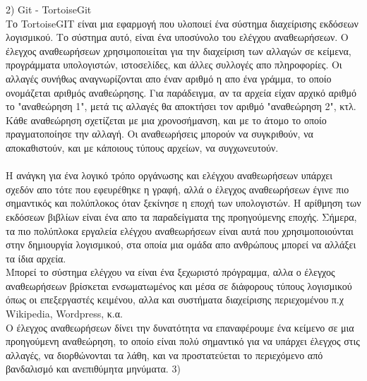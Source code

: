 2) Git - TortoiseGit\\
Το TortoiseGIT είναι μια εφαρμογή που υλοποιεί ένα σύστημα διαχείρισης εκδόσεων λογισμικού. Το σύστημα αυτό, είναι ένα υποσύνολο του ελέγχου αναθεωρήσεων. Ο έλεγχος αναθεωρήσεων χρησιμοποιείται για την διαχείριση των αλλαγών σε κείμενα, προγράμματα υπολογιστών, ιστοσελίδες, και άλλες συλλογές απο πληροφορίες. Οι αλλαγές συνήθως αναγνωρίζονται απο έναν αριθμό η απο ένα γράμμα, το οποίο ονομάζεται αριθμός αναθεώρησης. Για παράδειγμα, αν τα αρχεία είχαν αρχικό αριθμό το "αναθεώρηση 1", μετά τις αλλαγές θα αποκτήσει τον αριθμό "αναθεώρηση 2", κτλ. Κάθε αναθεώρηση σχετίζεται με μια χρονοσήμανση, και με το άτομο το οποίο πραγματοποίησε την αλλαγή. Οι αναθεωρήσεις μπορούν να συγκριθούν, να αποκαθιστούν, και με κάποιους τύπους αρχείων, να συγχωνευτούν.\\
\\
Η ανάγκη για ένα λογικό τρόπο οργάνωσης και ελέγχου αναθεωρήσεων υπάρχει σχεδόν απο τότε που εφευρέθηκε η γραφή, αλλά ο έλεγχος αναθεωρήσεων έγινε πιο σημαντικός και πολύπλοκος όταν ξεκίνησε η εποχή των υπολογιστών. Η αρίθμηση των εκδόσεων βιβλίων είναι ένα απο τα παραδείγματα της προηγούμενης εποχής. Σήμερα, τα πιο πολύπλοκα εργαλεία ελέγχου αναθεωρήσεων είναι αυτά που χρησιμοποιούνται στην δημιουργία λογισμικού, στα οποία μια ομάδα απο ανθρώπους μπορεί να αλλάξει τα ίδια αρχεία.\\
Μπορεί το σύστημα ελέγχου να είναι ένα ξεχωριστό πρόγραμμα, αλλα ο έλεγχος αναθεωρήσεων βρίσκεται ενσωματωμένος και μέσα σε διάφορους τύπους λογισμικού όπως οι επεξεργαστές κειμένου, αλλα και συστήματα διαχείρισης περιεχομένου
π.χ Wikipedia, Wordpress, κ.α.\\
Ο έλεγχος αναθεωρήσεων δίνει την δυνατότητα να επαναφέρουμε ένα κείμενο σε μια προηγούμενη αναθεώρηση, το οποίο είναι πολύ σημαντικό για να υπάρχει έλεγχος στις αλλαγές, να διορθώνονται τα λάθη, και να προστατεύεται το περιεχόμενο από βανδαλισμό και ανεπιθύμητα μηνύματα.
3) 